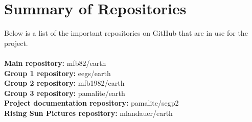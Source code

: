 \documentclass{article}
\begin{document}

\section{Summary of Repositories}

Below is a list of the important repositories on GitHub that are in use for the project.\\
\\
\textbf{Main repository: }mfb82/earth\\
\textbf{Group 1 repository: }eegs/earth\\
\textbf{Group 2 repository: }mfb1982/earth\\
\textbf{Group 3 repository: }pamalite/earth\\
\textbf{Project documentation repository: }pamalite/segp2\\
\textbf{Rising Sun Pictures repository: }mlandauer/earth\\

\end{document}
